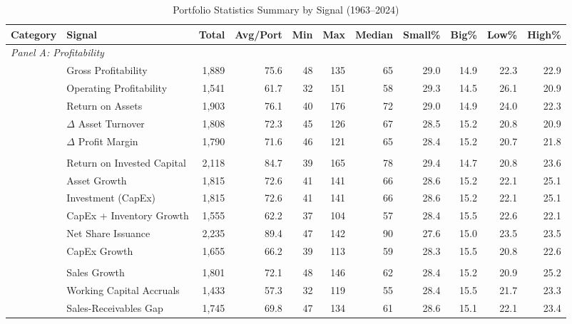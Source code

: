 \begin{table}[htbp]
\centering
\caption{Portfolio Statistics Summary by Signal (1963--2024)}
\label{tab:portfolio_statistics}

\begin{adjustbox}{width=0.9\linewidth}
\begin{tabular}{l l*{9}{r}}
\toprule
\textbf{Category} & \textbf{Signal} & \textbf{Total} & \textbf{Avg/Port} & \textbf{Min} & \textbf{Max} & \textbf{Median} & \textbf{Small\%} & \textbf{Big\%} & \textbf{Low\%} & \textbf{High\%} \\
\midrule
\multicolumn{11}{l}{\textit{Panel A: Profitability}} \\
 & Gross Profitability & 1,889 & 75.6 & 48 & 135 & 65 & 29.0 & 14.9 & 22.3 & 22.9 \\
 & Operating Profitability & 1,541 & 61.7 & 32 & 151 & 58 & 29.3 & 14.5 & 26.1 & 20.9 \\
 & Return on Assets & 1,903 & 76.1 & 40 & 176 & 72 & 29.0 & 14.9 & 24.0 & 22.3 \\
 & $\Delta$ Asset Turnover & 1,808 & 72.3 & 45 & 126 & 67 & 28.5 & 15.2 & 20.8 & 20.9 \\
 & $\Delta$ Profit Margin & 1,790 & 71.6 & 46 & 121 & 65 & 28.4 & 15.2 & 20.7 & 21.8 \\
\addlinespace
\multicolumn{11}{l}{\textit{Panel B: Investment}} \\
 & Return on Invested Capital & 2,118 & 84.7 & 39 & 165 & 78 & 29.4 & 14.7 & 20.8 & 23.6 \\
 & Asset Growth & 1,815 & 72.6 & 41 & 141 & 66 & 28.6 & 15.2 & 22.1 & 25.1 \\
 & Investment (CapEx) & 1,815 & 72.6 & 41 & 141 & 66 & 28.6 & 15.2 & 22.1 & 25.1 \\
 & CapEx + Inventory Growth & 1,555 & 62.2 & 37 & 104 & 57 & 28.4 & 15.5 & 22.6 & 22.1 \\
 & Net Share Issuance & 2,235 & 89.4 & 47 & 142 & 90 & 27.6 & 15.0 & 23.5 & 23.5 \\
 & CapEx Growth & 1,655 & 66.2 & 39 & 113 & 59 & 28.3 & 15.5 & 20.8 & 22.6 \\
\addlinespace
\multicolumn{11}{l}{\textit{Panel C: Accruals \& Quality}} \\
 & Sales Growth & 1,801 & 72.1 & 48 & 146 & 62 & 28.4 & 15.2 & 20.9 & 25.2 \\
 & Working Capital Accruals & 1,433 & 57.3 & 32 & 119 & 55 & 28.4 & 15.5 & 21.7 & 23.3 \\
 & Sales-Receivables Gap & 1,745 & 69.8 & 47 & 134 & 61 & 28.6 & 15.1 & 22.1 & 23.4 \\

\end{tabular}
\end{adjustbox}
\end{table}
